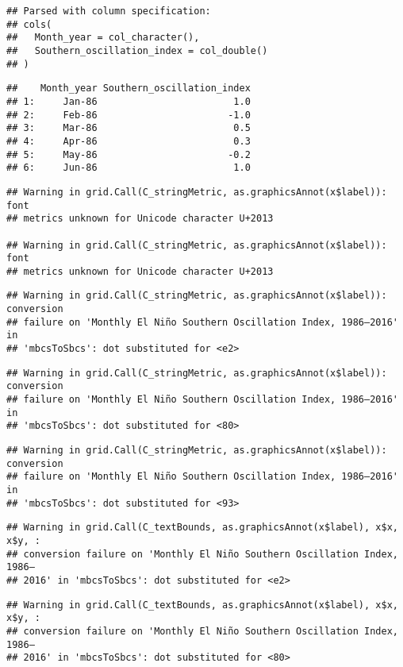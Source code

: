 \documentclass[]{article}
\theoremstyle{definition}
\theoremstyle{definition}
\theoremstyle{definition}
\theoremstyle{remark}
\begin{document}
\begin{verbatim}
## Parsed with column specification:
## cols(
##   Month_year = col_character(),
##   Southern_oscillation_index = col_double()
## )
\end{verbatim}

\begin{verbatim}
##    Month_year Southern_oscillation_index
## 1:     Jan-86                        1.0
## 2:     Feb-86                       -1.0
## 3:     Mar-86                        0.5
## 4:     Apr-86                        0.3
## 5:     May-86                       -0.2
## 6:     Jun-86                        1.0
\end{verbatim}

\begin{verbatim}
## Warning in grid.Call(C_stringMetric, as.graphicsAnnot(x$label)): font
## metrics unknown for Unicode character U+2013

## Warning in grid.Call(C_stringMetric, as.graphicsAnnot(x$label)): font
## metrics unknown for Unicode character U+2013
\end{verbatim}

\begin{verbatim}
## Warning in grid.Call(C_stringMetric, as.graphicsAnnot(x$label)): conversion
## failure on 'Monthly El Niño Southern Oscillation Index, 1986–2016' in
## 'mbcsToSbcs': dot substituted for <e2>
\end{verbatim}

\begin{verbatim}
## Warning in grid.Call(C_stringMetric, as.graphicsAnnot(x$label)): conversion
## failure on 'Monthly El Niño Southern Oscillation Index, 1986–2016' in
## 'mbcsToSbcs': dot substituted for <80>
\end{verbatim}

\begin{verbatim}
## Warning in grid.Call(C_stringMetric, as.graphicsAnnot(x$label)): conversion
## failure on 'Monthly El Niño Southern Oscillation Index, 1986–2016' in
## 'mbcsToSbcs': dot substituted for <93>
\end{verbatim}

\begin{verbatim}
## Warning in grid.Call(C_textBounds, as.graphicsAnnot(x$label), x$x, x$y, :
## conversion failure on 'Monthly El Niño Southern Oscillation Index, 1986–
## 2016' in 'mbcsToSbcs': dot substituted for <e2>
\end{verbatim}

\begin{verbatim}
## Warning in grid.Call(C_textBounds, as.graphicsAnnot(x$label), x$x, x$y, :
## conversion failure on 'Monthly El Niño Southern Oscillation Index, 1986–
## 2016' in 'mbcsToSbcs': dot substituted for <80>
\end{verbatim}
\end{document}

